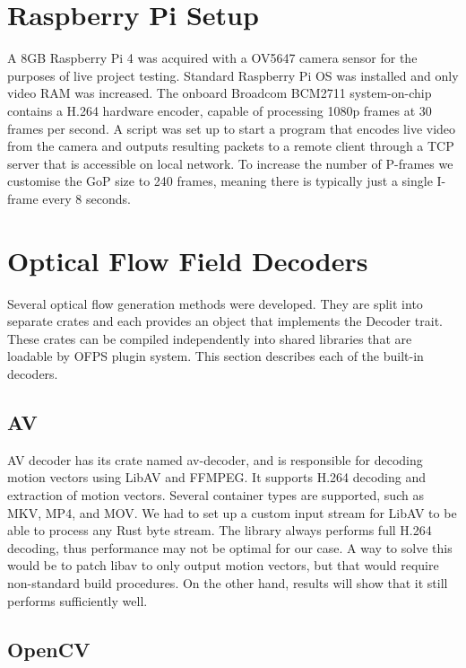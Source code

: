 \documentclass[11pt,english]{report}
\begin{document}
\section{Raspberry Pi Setup}

A 8GB Raspberry Pi 4 was acquired with a OV5647 camera sensor for the purposes of live project testing. Standard Raspberry Pi OS was installed and only video RAM was increased. The onboard Broadcom BCM2711 system-on-chip contains a H.264 hardware encoder, capable of processing 1080p frames at 30 frames per second. A script was set up to start a program that encodes live video from the camera and outputs resulting packets to a remote client through a TCP server that is accessible on local network. To increase the number of P-frames we customise the GoP size to 240 frames, meaning there is typically just a single I-frame every 8 seconds.

\section{Optical Flow Field Decoders}

Several optical flow generation methods were developed. They are split into separate crates and each provides an object that implements the Decoder trait. These crates can be compiled independently into shared libraries that are loadable by OFPS plugin system. This section describes each of the built-in decoders.

\subsection{AV}

AV decoder has its crate named av-decoder, and is responsible for decoding motion vectors using LibAV and FFMPEG. It supports H.264 decoding and extraction of motion vectors. Several container types are supported, such as MKV, MP4, and MOV. We had to set up a custom input stream for LibAV to be able to process any Rust byte stream. The library always performs full H.264 decoding, thus performance may not be optimal for our case. A way to solve this would be to patch libav to only output motion vectors\cite{libav-patch}, but that would require non-standard build procedures. On the other hand, results will show that it still performs sufficiently well.

\subsection{OpenCV}
\end{document}
